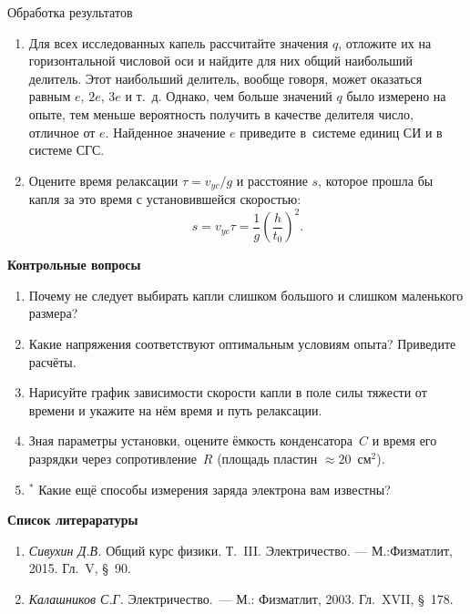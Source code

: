 {\rm Обработка результатов}
\begin{enumerate}

\item{ Для всех исследованных капель рассчитайте значения $q$, отложите их на горизонтальной числовой оси и найдите для них общий наибольший делитель. Этот наибольший делитель, вообще говоря, может оказаться равным $e$, $2e$, $3e$ и т.~д.
Однако, чем больше значений $q$ было измерено на опыте, тем меньше вероятность получить в качестве делителя число,
отличное от $e$. Найденное значение $e$ приведите в~системе единиц СИ и в системе СГС.}

\item{ Оцените время релаксации $\tau=v_{yc}/g$ и расстояние $s$, которое прошла бы капля за это время с установившейся скоростью:
$$
s=v_{yc}\tau=\frac{1}{g}\left(\frac{h}{t_0}\right)^2.
$$}

\end{enumerate}


{\small

{\bf \Large Контрольные вопросы}
\begin{enumerate}

\item{ Почему не следует выбирать капли слишком большого и слишком маленького размера?}

\item{ Какие напряжения соответствуют оптимальным условиям опыта? Приведите расчёты.}

\item{ Нарисуйте график зависимости скорости капли в поле силы тяжести от времени и укажите на нём время и путь релаксации.}

\item{ Зная параметры установки, оцените ёмкость конденсатора~$C$ и время его разрядки через сопротивление~$R$ (площадь пластин ${\approx}20$~см$^2$).}

\item{$^*$ Какие ещё способы измерения заряда электрона вам известны?}
\end{enumerate}

{\bf \Large Список литераратуры}

\begin{enumerate}

\item{ {\em Сивухин Д.В.} Общий курс физики. Т.~III. Электричество. --- М.:Физматлит, 2015. Гл.~V, \S~90.}

\item{ {\em Калашников С.Г.} Электричество.~--- М.: Физматлит, 2003. Гл.~XVII, \S~178.}
\end{enumerate}
}